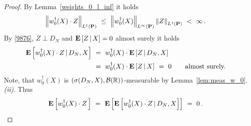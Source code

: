 \begin{proof}
  By Lemma~\ref{weights_0_l_inf} it holds
  \begin{gather}
    \label{9876}
    \norm{
  w_0^\dagger(X)\cdot Z
    }_{L^1(\P)}
    \ 
  \le
    \ 
  \norm{w_0^\dagger(X)}_{L^\infty(\P)}
  \norm{Z}_{L^1(\P)}
  \ 
  <
  \ 
  \infty
  \,.
  \end{gather}
  By 
  \eqref{9876},
  $Z\perp D_N$
  and
  $
\mathbf{E}
\left[
  Z
  \,
  |
  \, 
  X
\right]
= 0
  $
  almost surely
  it holds 
  \begin{align*}
    \E
  \left[
  w_0^\dagger(X)
  \cdot
  Z
  \,
  |
  \,
  D_N,X
  \right]
  &
  \ 
  =
  \ 
  w_0^\dagger(X)
  \cdot
  \E
  \left[
  Z
  \,
  |
  \,
  D_N,X
  \right]
  \\
  &
  \ 
  =
  \ 
  w_0^\dagger(X)
  \cdot
  \E
  \left[
  Z
  \,
  |
  \,
  X
  \right]
  \
  =
  \ 
  0
  \qquad
  \text{almost surely.}
  \end{align*}
  Note, that $w_0^\dagger(X)$ is 
  $
  \left(
  \sigma(D_N,X),\mathcal{B}(\mathbb{R})
  \right)
  $-measurable by Lemma~\ref{lem:meas_w_0}.\textit{(ii)}.  
  Thus
  \begin{gather*}
    \E
    \left[
  w_0^\dagger(X)
  \cdot
  Z
  \,
    \right]
    \ 
    =
    \ 
    \E
    \left[
 \E
  \left[
  w_0^\dagger(X)
  \cdot
  Z
  \,
  |
  \,
  D_N,X
  \right]
    \right]
    \ 
    =
    \ 
    0
    \,.
     \end{gather*}
\end{proof}

